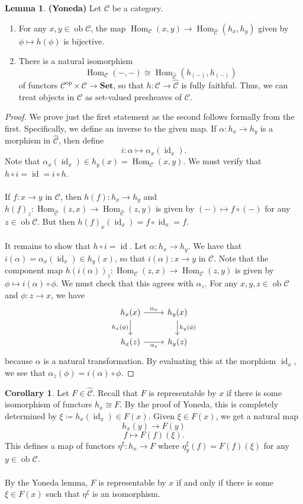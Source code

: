 \documentclass[10pt,letterpaper,cm]{nupset}
\theoremstyle{definition}
\newtheorem{corollary}{Corollary}
\newtheorem{lemma}{Lemma}
\newcommand{\1}{\mathbf{1}}
\renewcommand{\c}{\mathscr{C}}
\newcommand{\0}{\vec 0}
\DeclareMathOperator{\id}{id}
\DeclareMathOperator{\op}{op}
\DeclareMathOperator{\ob}{ob}
\DeclareMathOperator{\Hom}{Hom}
\begin{document}
\begin{lemma}{\textbf{(Yoneda)}} Let $\c$ be a category.
\begin{enumerate}
\item For any $x, y \in \ob \c$, the map $\Hom_{\c}(x, y) \to \Hom_{\widehat{\c}}(h_x, h_y)$ given by $\phi \mapsto h(\phi)$ is bijective.
\item There is a natural isomorphism $$\Hom_{\c}(-, -) \cong \Hom_{\widehat{\c}}(h_{(-)}, h_{(-)})$$ of functors $ \c^{\op} \times \c \to \mathbf{Set}$, so that $h : \c \to \widehat{\c}$ is fully faithful. Thus, we can treat objects in $\c$ as set-valued presheaves of $\c$.
\end{enumerate}
\end{lemma}
\begin{proof}
We prove just the first statement as the second follows formally from the first.
Specifically, we define an inverse to the given map. If $\alpha : h_x \to h_y$ is a morphism in $\widehat{\c}$, then define $$i : \alpha \mapsto \alpha_x(\id_x).$$ Note that $\alpha_x(\id_x) \in h_y(x) = \Hom_{\c}(x,y)$. We must verify that $h \circ i = \id = i \circ h$.
\\ \\ If $f: x \to y$ in $\c$, then $h(f) : h_x \to h_y$ and $h(f)_z : \Hom_{\widehat{\c}}(z, x) \to \Hom_{\widehat{\c}}(z, y)$ is given by $(-) \mapsto f \circ (-)$ for any $z\in \ob \c$. But then $h(f)_x(\id_x) = f\circ \id_x = f$.
\\ \\ It remains to show that $h \circ i = \id$. Let $\alpha : h_x \to h_y$.  We have that $
i(\alpha) = \alpha_x(\id_x) \in h_y(x)$, so that $i(\alpha) : x \to y$ in $\c$. Note that the component map $h(i(\alpha))_z : \Hom_{\c}(z, x) \to \Hom_{\c}(z, y)$ is given by $\phi \mapsto i(\alpha) \circ \phi.$ We must check that this agrees with $\alpha_z$. For any $x, y, z \in \ob \c$ and $\phi : z \to x$, we have
\[
\begin{tikzcd}
h_x(x) \arrow[r, "\alpha_x"] \arrow[d, "h_x(\phi)"'] & h_y(x) \arrow[d, "h_y(\phi)"] \\
h_x(z) \arrow[r, "\alpha_z"'] & h_y(z)
\end{tikzcd}
\]
because $\alpha$ is a natural transformation. By evaluating this at the morphism $\id_x$, we see that $\alpha_z(\phi) = i(\alpha) \circ \phi$.
\end{proof}

\begin{corollary}
Let $F \in \widehat{\c}$. Recall that $F$ is representable by $x$ if there is some isomorphism of functors $h_x \cong F$. By the proof of Yoneda, this is completely determined by $\xi\coloneqq  h_x(\id_x) \in F(x)$. Given $\xi \in F(x)$, we get a natural map $$h_x(y) \to F(y)$$ $$ f \mapsto F(f)(\xi).$$ This defines a map of functors $\eta^{\xi} : h_x \to F$ where $\eta^{\xi}_y(f) = F(f)(\xi)$ for any $y \in \ob \c$. 
\\ \\ By the Yoneda lemma, $F$ is representable by $x$  if and only if there is some $\xi \in F(x)$ such that $\eta^{\xi}$ is an isomorphism. 
\end{corollary}
\end{document}

